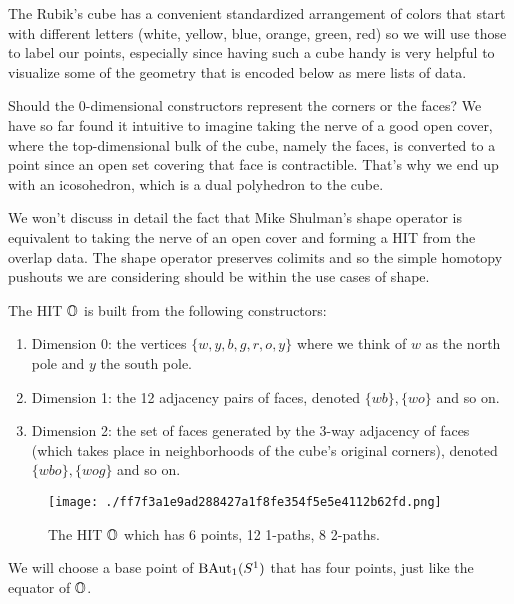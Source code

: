 The Rubik's cube has a convenient standardized arrangement of colors
that start with different letters (white, yellow, blue, orange, green,
red) so we will use those to label our points, especially since having
such a cube handy is very helpful to visualize some of the geometry that
is encoded below as mere lists of data.

Should the 0-dimensional constructors represent the corners or the
faces? We have so far found it intuitive to imagine taking the nerve of
a good open cover, where the top-dimensional bulk of the cube, namely
the faces, is converted to a point since an open set covering that face
is contractible. That's why we end up with an icosohedron, which is a
dual polyhedron to the cube.

We won't discuss in detail the fact that Mike Shulman's shape operator
\cite{shulman_cohesion} is equivalent to taking the nerve of an open
cover and forming a HIT from the overlap data. The shape operator
preserves colimits and so the simple homotopy pushouts we are
considering should be within the use cases of shape.

The HIT \(\mathbb{O}\) is built from the following constructors:

\begin{enumerate}
\item
  Dimension 0: the vertices \(\{w, y, b, g, r, o, y\}\) where we think
  of \(w\) as the north pole and \(y\) the south pole.
\item
  Dimension 1: the 12 adjacency pairs of faces, denoted
  \(\{wb\}, \{wo\}\) and so on.
\item
  Dimension 2: the set of faces generated by the 3-way adjacency of
  faces (which takes place in neighborhoods of the cube's original
  corners), denoted \(\{wbo\}, \{wog\}\) and so on.
\end{enumerate}

\begin{figure}
\centering
\begin{minipage}[t]{0.45\linewidth}
\centering
\end{minipage}
\hfill
\begin{minipage}[t]{0.45\linewidth}
\texttt{[image: ./ff7f3a1e9ad288427a1f8fe354f5e5e4112b62fd.png]}
\end{minipage}
\caption{The HIT \(\mathbb{O}\) which has 6 points, 12 1-paths, 8 2-paths.}
\end{figure}

We will choose a base point of \(\mathrm{BAut}_1(S^1)\) that has four points, just
like the equator of \(\mathbb{O}\).

